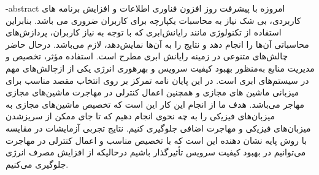 \fa-abstract{
اﻣﺮوزه ﺑﺎ ﭘﯿﺸﺮﻓﺖ روز اﻓﺰون ﻓﻨﺎوری اﻃﻼﻋﺎت و  اﻓﺰاﯾﺶ ﺑﺮﻧﺎﻣﻪ ﻫﺎی ﮐﺎرﺑﺮدی، ﺑﯽ شک ﻧﯿﺎز ﺑﻪ ﻣﺤﺎﺳﺒﺎت یکپارچه ﺑﺮای ﮐﺎرﺑﺮان ﺿﺮوری می ﺑﺎﺷﺪ. ﺑﻨﺎﺑﺮاﯾﻦ اﺳﺘﻔﺎده از ﺗﮑﻨﻮﻟﻮژی ﻣﺎﻧﻨﺪ راﯾﺎﻧﺶاﺑﺮی ﮐﻪ ﺑﺎ ﺗﻮﺟﻪ ﺑﻪ ﻧﯿﺎز ﮐﺎرﺑﺮان، ﭘﺮدازش‌ﻫﺎی ﻣﺤﺎﺳﺒﺎتی آن‌ﻫﺎ را اﻧﺠﺎم دﻫﺪ و ﻧﺘﺎﯾﺞ را ﺑﻪ آن‌ﻫﺎ ﻧﻤﺎﯾﺶدﻫﺪ، ﻻزم می‌باشد. درﺣﺎل ﺣﺎﺿﺮ ﭼﺎﻟﺶﻫﺎی ﻣﺘﻨﻮعی در زﻣﯿﻨﻪ راﯾﺎﻧﺶ اﺑﺮی ﻣﻄﺮح اﺳﺖ. استفاده مؤثر، ﺗﺨﺼﯿﺺ و مدیریت منابع به‌منظور بهبود کیفیت سرویس و بهره­وری انرژی یکی از ازﭼﺎﻟﺶﻫﺎی ﻣﻬﻢ در سیستم‌های ابری است.
در این پایان نامه تمرکز بر روی انتخاب مقصد مناسب برای میزبانی ماشین های مجازی و همچنین اعمال کنترلی در مهاجرت ماشین‌های مجازی مهاجر می‌باشد. هدف ما از انجام این کار این است ﮐﻪ ﺗﺨﺼﯿﺺ ﻣﺎﺷﯿﻦﻫﺎی ﻣﺠﺎزی ﺑﻪ ﻣﯿﺰﺑﺎنﻫﺎی ﻓﯿﺰﯾکی را ﺑﻪ ﭼﻪ ﻧﺤﻮی اﻧﺠﺎم دﻫﯿﻢ ﮐﻪ ﺗﺎ ﺟﺎی ﻣمکن از ﺳﺮﯾﺰﺷﺪن ﻣﯿﺰﺑﺎنﻫﺎی ﻓﯿﺰﯾکی و مهاجرت اضافی جلوگیری ﮐﻨﯿﻢ. نتایج تجربی آزمایشات در مقایسه با روش‌ پایه نشان دهنده این است که با تخصیص مناسب و اعمال کنترلی در مهاجرت می‌‌توانیم در بهبود کیفیت سرویس تأثیرگذار باشیم درحالیکه از افزایش مصرف انرژی جلوگیری می‌کنیم.
}





\newpage\clearpage
